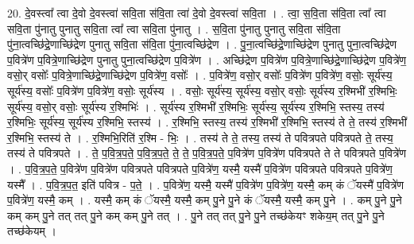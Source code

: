 \documentclass[17pt]{extarticle}
\begin{document}
20. दे॒वस्त्वा᳚ त्वा दे॒वो दे॒वस्त्वा॑ सवि॒ता स॑वि॒ता त्वा॑ दे॒वो दे॒वस्त्वा॑ सवि॒ता । . त्वा॒ स॒वि॒ता स॑वि॒ता त्वा᳚ त्वा सवि॒ता पु॑नातु पुनातु सवि॒ता त्वा᳚ त्वा सवि॒ता पु॑नातु । . स॒वि॒ता पु॑नातु पुनातु सवि॒ता स॑वि॒ता पु॑ना॒त्वच्छि॑द्रे॒णाच्छि॑द्रेण पुनातु सवि॒ता स॑वि॒ता पु॑ना॒त्वच्छि॑द्रेण । . पु॒ना॒त्वच्छि॑द्रे॒णाच्छि॑द्रेण पुनातु पुना॒त्वच्छि॑द्रेण प॒वित्रे॑ण प॒वित्रे॒णाच्छि॑द्रेण पुनातु पुना॒त्वच्छि॑द्रेण प॒वित्रे॑ण । . अच्छि॑द्रेण प॒वित्रे॑ण प॒वित्रे॒णाच्छि॑द्रे॒णाच्छि॑द्रेण प॒वित्रे॑ण॒ वसो॒र् वसोः᳚ प॒वित्रे॒णाच्छि॑द्रे॒णाच्छि॑द्रेण प॒वित्रे॑ण॒ वसोः᳚ । . प॒वित्रे॑ण॒ वसो॒र् वसोः᳚ प॒वित्रे॑ण प॒वित्रे॑ण॒ वसोः॒ सूर्य॑स्य॒ सूर्य॑स्य॒ वसोः᳚ प॒वित्रे॑ण प॒वित्रे॑ण॒ वसोः॒ सूर्य॑स्य । . वसोः॒ सूर्य॑स्य॒ सूर्य॑स्य॒ वसो॒र् वसोः॒ सूर्य॑स्य र॒श्मिभी॑ र॒श्मिभिः॒ सूर्य॑स्य॒ वसो॒र् वसोः॒ सूर्य॑स्य र॒श्मिभिः॑ । . सूर्य॑स्य र॒श्मिभी॑ र॒श्मिभिः॒ सूर्य॑स्य॒ सूर्य॑स्य र॒श्मिभि॒ स्तस्य॒ तस्य॑ र॒श्मिभिः॒ सूर्य॑स्य॒ सूर्य॑स्य र॒श्मिभि॒ स्तस्य॑ । . र॒श्मिभि॒ स्तस्य॒ तस्य॑ र॒श्मिभी॑ र॒श्मिभि॒ स्तस्य॑ ते ते॒ तस्य॑ र॒श्मिभी॑ र॒श्मिभि॒ स्तस्य॑ ते । . र॒श्मिभि॒रिति॑ र॒श्मि - भिः॒ । . तस्य॑ ते ते॒ तस्य॒ तस्य॑ ते पवित्रपते पवित्रपते ते॒ तस्य॒ तस्य॑ ते पवित्रपते । . ते॒ प॒वि॒त्र॒प॒ते॒ प॒वि॒त्र॒प॒ते॒ ते॒ ते॒ प॒वि॒त्र॒प॒ते॒ प॒वित्रे॑ण प॒वित्रे॑ण पवित्रपते ते ते पवित्रपते प॒वित्रे॑ण । . प॒वि॒त्र॒प॒ते॒ प॒वित्रे॑ण प॒वित्रे॑ण पवित्रपते पवित्रपते प॒वित्रे॑ण॒ यस्मै॒ यस्मै॑ प॒वित्रे॑ण पवित्रपते पवित्रपते प॒वित्रे॑ण॒ यस्मै᳚ । . प॒वि॒त्र॒प॒त॒ इति॑ पवित्र - प॒ते॒ । . प॒वित्रे॑ण॒ यस्मै॒ यस्मै॑ प॒वित्रे॑ण प॒वित्रे॑ण॒ यस्मै॒ कम् कं ॅयस्मै॑ प॒वित्रे॑ण प॒वित्रे॑ण॒ यस्मै॒ कम् । . यस्मै॒ कम् कं ॅयस्मै॒ यस्मै॒ कम् पु॒ने पु॒ने कं ॅयस्मै॒ यस्मै॒ कम् पु॒ने । . कम् पु॒ने पु॒ने कम् कम् पु॒ने तत् तत् पु॒ने कम् कम् पु॒ने तत् । . पु॒ने तत् तत् पु॒ने पु॒ने तच्छ॑केयꣳ शकेय॒म् तत् पु॒ने पु॒ने तच्छ॑केयम् । \newline
\end{document}
